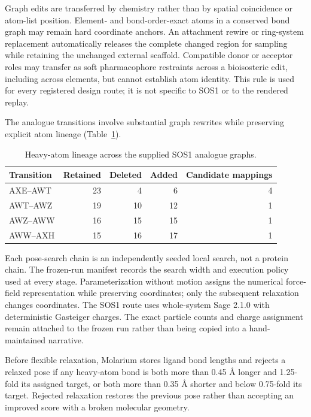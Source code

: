 \documentclass[11pt]{article}
\begin{document}
\begin{small}
Graph edits are transferred by chemistry rather than by spatial coincidence or atom-list position. Element- and bond-order-exact atoms in a conserved bond graph may remain hard coordinate anchors. An attachment rewire or ring-system replacement automatically releases the complete changed region for sampling while retaining the unchanged external scaffold. Compatible donor or acceptor roles may transfer as soft pharmacophore restraints across a bioisosteric edit, including across elements, but cannot establish atom identity. This rule is used for every registered design route; it is not specific to SOS1 or to the rendered replay.

The analogue transitions involve substantial graph rewrites while preserving explicit atom lineage (Table~\ref{tab:appA_lineage}).

\begin{table}[htbp]
\centering\small
\caption{Heavy-atom lineage across the supplied SOS1 analogue graphs.}
\label{tab:appA_lineage}
\begin{tabular}{@{}lrrrr@{}}
\toprule
\textbf{Transition} & \textbf{Retained} & \textbf{Deleted} & \textbf{Added} & \textbf{Candidate mappings}\\
\midrule
AXE--AWT & 23 & 4 & 6 & 4\\
AWT--AWZ & 19 & 10 & 12 & 1\\
AWZ--AWW & 16 & 15 & 15 & 1\\
AWW--AXH & 15 & 16 & 17 & 1\\
\bottomrule
\end{tabular}
\end{table}

Each pose-search chain is an independently seeded local search, not a protein chain. The frozen-run manifest records the search width and execution policy used at every stage. Parameterization without motion assigns the numerical force-field representation while preserving coordinates; only the subsequent relaxation changes coordinates. The SOS1 route uses whole-system Sage 2.1.0 with deterministic Gasteiger charges. The exact particle counts and charge assignment remain attached to the frozen run rather than being copied into a hand-maintained narrative.

Before flexible relaxation, Molarium stores ligand bond lengths and rejects a relaxed pose if any heavy-atom bond is both more than 0.45 \AA{} longer and 1.25-fold its assigned target, or both more than 0.35 \AA{} shorter and below 0.75-fold its target. Rejected relaxation restores the previous pose rather than accepting an improved score with a broken molecular geometry.


\end{small}
\end{document}
